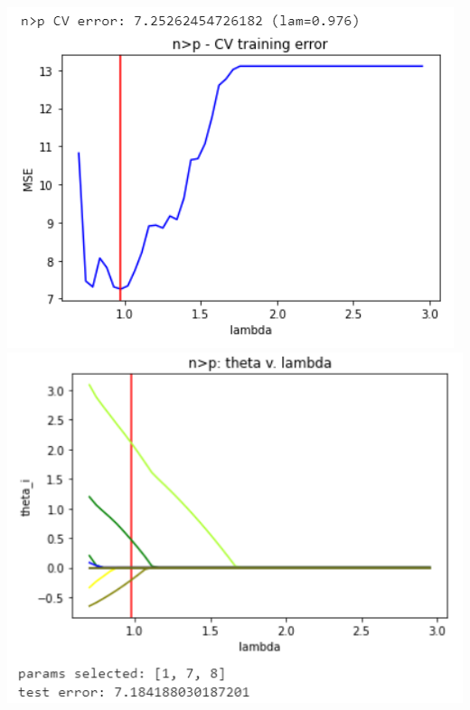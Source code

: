 \documentclass[11pt]{article}
\begin{document}
\begin{center}
\includegraphics[scale=0.7]{charts/ridge_q_ortho_n_gt_p_err.PNG}
\includegraphics[scale=0.7]{charts/ridge_q_ortho_n_gt_p_thetas.PNG}


\end{center}
\end{document}
